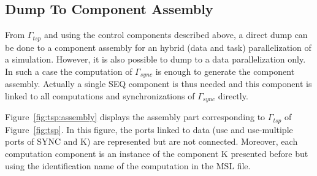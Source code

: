 \subsection{Dump To Component Assembly}
From $\Gamma_{tsp}$ and using the control components described above,
a direct dump can be done to a component assembly for an hybrid (data
and task) parallelization of a simulation. 
However, it is also
possible to dump to a data parallelization only. In such a case the
computation of $\Gamma_{sync}$ is enough to generate the component
assembly. Actually a single SEQ component is thus needed and this
component is linked to all computations and synchronizations of
$\Gamma_{sync}$ directly.

Figure~\ref{fig:tsp:assembly} displays the assembly part corresponding to
$\Gamma_{tsp}$ of Figure~\ref{fig:tsp}. In this figure, the ports
linked to data (use and use-multiple ports of SYNC and K) are
represented but are not connected. Moreover, each computation
component is an instance of the component K presented before but using
the identification name of the computation in the MSL file.

